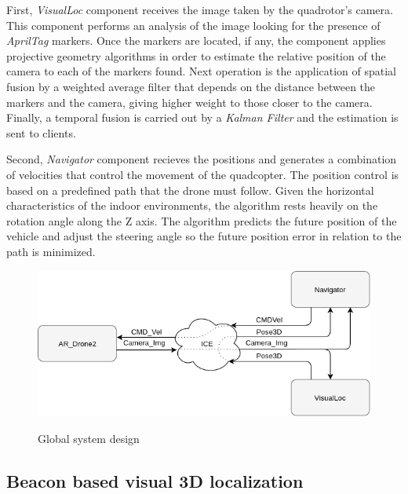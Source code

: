 \documentclass{styles/svproc}
\begin{document}
	First, \textit{VisualLoc} component receives the image taken by the quadrotor's camera. This component performs an analysis of the image looking for the presence of \textit{AprilTag} markers. Once the markers are located, if any, the component applies projective geometry algorithms in order to estimate the relative position of the camera to each of the markers found. Next operation is the application of spatial fusion by a weighted average filter that depends on the distance between the markers and the camera, giving higher weight to those closer to the camera. Finally, a temporal fusion is carried out by a \textit{Kalman Filter} and the estimation is sent to clients.

        Second, \textit{Navigator} component recieves the positions and generates a combination of velocities that control the movement of the quadcopter. The position control is based on a predefined path that the drone must follow. Given the horizontal characteristics of the indoor environments, the algorithm rests heavily on the rotation angle along the Z axis. The algorithm predicts the future position of the vehicle and adjust the steering angle so the future position error in relation to the path is minimized.

        \begin{figure}[h]
          \begin{center}
            {\includegraphics[width=\linewidth]{interactuacionproj.png}}
          \end{center}
          \caption{Global system design}
	\end{figure}
        
\subsection{Beacon based visual 3D localization}
\end{document}
